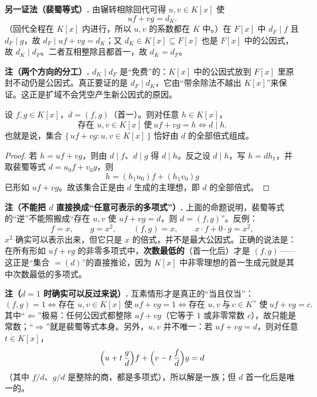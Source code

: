 \noindent\textbf{另一证法（裴蜀等式）.} 由辗转相除回代可得 \(u,v\in K[x]\) 使
\[
uf+vg=d_K .
\]
（回代全程在 \(K[x]\) 内进行，所以 \(u,v\) 的系数都在 \(K\) 中。）在 \(F[x]\) 中 \(d_F\mid f\) 且 \(d_F\mid g\)，故 \(d_F\mid uf+vg=d_K\)；又 \(d_K\in K[x]\subseteq F[x]\) 也是 \(F[x]\) 中的公因式，故 \(d_K\mid d_F\)。二者互相整除且都首一，故 \(d_K=d_F\)。

\noindent\textbf{注（两个方向的分工）.} \(d_K\mid d_F\) 是“免费”的：\(K[x]\) 中的公因式放到 \(F[x]\) 里原封不动仍是公因式。真正要证的是 \(d_F\mid d_K\)，它由“带余除法不越出 \(K[x]\)”来保证。这正是扩域不会凭空产生新公因式的原因。

\begin{proposition}
设 \(f,g\in K[x]\)，\(d=(f,g)\)（首一）。则对任意 \(h\in K[x]\)，
\[
\text{存在 }u,v\in K[x]\ \text{使}\ uf+vg=h\iff d\mid h .
\]
也就是说，集合 \(\{\,uf+vg:u,v\in K[x]\,\}\) 恰好由 \(d\) 的全部倍式组成。
\end{proposition}

\begin{proof}
若 \(h=uf+vg\)，则由 \(d\mid f\)、\(d\mid g\) 得 \(d\mid h\)。反之设 \(d\mid h\)，写 \(h=dh_1\)，并取裴蜀等式 \(d=u_0f+v_0g\)，则
\[
h=(h_1u_0)f+(h_1v_0)g
\]
已形如 \(uf+vg\)。故该集合正是由 \(d\) 生成的主理想，即 \(d\) 的全部倍式。
\end{proof}

\noindent\textbf{注（不能把 \(d\) 直接换成“任意可表示的多项式”）.} 上面的命题说明，裴蜀等式的“逆”不能照搬成“存在 \(u,v\) 使 \(uf+vg=d\)，则 \(d=(f,g)\)”。反例：
\[
f=x,\qquad g=x^2,\qquad (f,g)=x,\qquad x\cdot f+0\cdot g=x^2 ,
\]
\(x^2\) 确实可以表示出来，但它只是 \(x\) 的倍式，并不是最大公因式。正确的说法是：在所有形如 \(uf+vg\) 的非零多项式中，\textbf{次数最低的}（首一化后）才是 \((f,g)\)——这正是“集合 \(=(d)\)”的直接推论，因为 \(K[x]\) 中非零理想的首一生成元就是其中次数最低的多项式。

\noindent\textbf{注（\(d=1\) 时确实可以反过来说）.} 互素情形才是真正的“当且仅当”：
\[
(f,g)=1\iff \text{存在 }u,v\in K[x]\ \text{使}\ uf+vg=1
\iff \text{存在 }u,v\ \text{与}\ c\in K^\times\ \text{使}\ uf+vg=c .
\]
其中“\(\Leftarrow\)”极易：任何公因式都整除 \(uf+vg\)（它等于 \(1\) 或非零常数 \(c\)），故只能是常数；“\(\Rightarrow\)”就是裴蜀等式本身。另外，\(u,v\) 并不唯一：若 \(uf+vg=d\)，则对任意 \(t\in K[x]\)，
\[
\Bigl(u+t\,\frac{g}{d}\Bigr)f+\Bigl(v-t\,\frac{f}{d}\Bigr)g=d
\]
（其中 \(f/d\)、\(g/d\) 是整除的商，都是多项式），所以解是一族；但 \(d\) 首一化后是唯一的。

